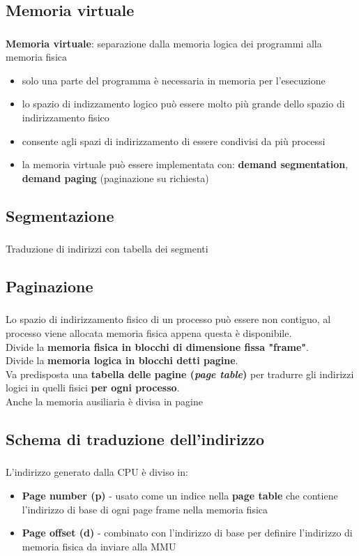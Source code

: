 \documentclass{beamer}
\newenvironment{mainframe}{
	\begin{frame}
		\frametitle{\insertsubsection}
		\framesubtitle{\insertsection}
	}{
	\end{frame}
}
\begin{document}
\subsection{Memoria virtuale}
\begin{mainframe}
	\textbf{Memoria virtuale}: separazione dalla memoria logica dei programmi alla memoria fisica
	\begin{itemize}
		\item solo una parte del programma è necessaria in memoria per l'esecuzione
		\item lo spazio di indizzamento logico può essere molto più grande dello spazio di indirizzamento fisico
		\item consente agli spazi di indirizzamento di essere condivisi da più processi
		\item la memoria virtuale può essere implementata con: \textbf{demand segmentation}, \textbf{demand paging} (paginazione su richiesta)
	\end{itemize}
\end{mainframe}
\subsection{Segmentazione}
\begin{mainframe}
	Traduzione di indirizzi con tabella dei segmenti
\end{mainframe}
\subsection{Paginazione}
\begin{mainframe}
	Lo spazio di indirizzamento fisico di un processo può essere non contiguo, al processo viene allocata memoria fisica appena questa è disponibile.\\
	Divide la \textbf{memoria fisica in blocchi di dimensione fissa "frame"}.\\
	Divide la \textbf{memoria logica in blocchi detti pagine}.\\
	Va predisposta una \textbf{tabella delle pagine (\textit{page table})} per tradurre gli indirizzi logici in quelli fisici \textbf{per ogni processo}.\\
	Anche la memoria ausiliaria è divisa in pagine
\end{mainframe}
\subsection{Schema di traduzione dell'indirizzo}
\begin{mainframe}
	L'indirizzo generato dalla CPU è diviso in:
	\begin{itemize}
		\item \textbf{Page number (p)} - usato come un indice nella \textbf{page table} che contiene l'indirizzo di base di ogni page frame nella memoria fisica
		\item \textbf{Page offset (d)} - combinato con l'indirizzo di base per definire l'indirizzo di memoria fisica da inviare alla MMU
	\end{itemize}
\end{mainframe}
\end{document}
